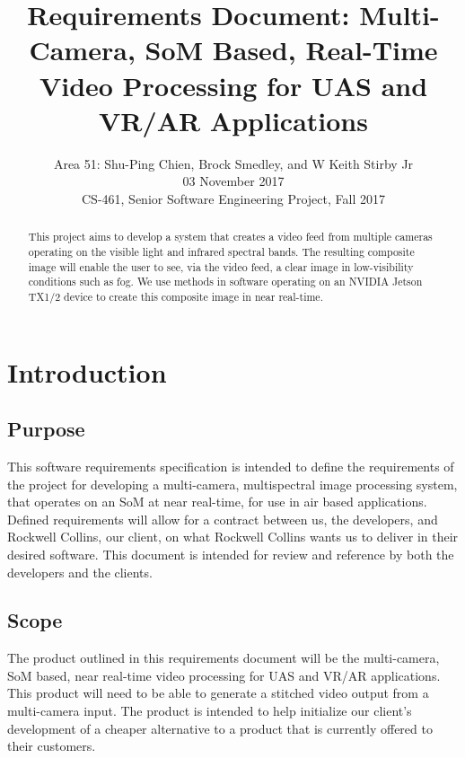 \documentclass[letterpaper,10pt,serif,draftclsnofoot,onecolumn,compsoc,titlepage]{IEEEtran}
\title{Requirements Document: Multi-Camera, SoM Based, Real-Time Video Processing for UAS and VR/AR Applications}
\author{Area 51: Shu-Ping Chien, Brock Smedley, and W Keith Stirby Jr \\ 03 November 2017 \\ CS-461, Senior Software Engineering Project, Fall 2017}
\begin{document}
\begin{titlepage}
\maketitle
\begin{abstract}

This project aims to develop a system that creates a video feed from multiple cameras 
operating on the visible light and infrared spectral bands. The resulting composite 
image will enable the user to see, via the video feed, a clear image in low-visibility 
conditions such as fog. We use methods in software operating on an NVIDIA Jetson 
TX1/2 device to create this composite image in near real-time.\\

\thispagestyle{empty}
\end{abstract}
\end{titlepage}
\newpage

\tableofcontents
\newpage

\section{Introduction}

\subsection{Purpose}

This software requirements specification is intended to define the requirements of the 
project for developing a multi-camera, multispectral image processing system, that 
operates on an SoM at near real-time, for use in air based 
applications. Defined requirements will allow for a contract between us, the 
developers, and Rockwell Collins, our client, on what Rockwell Collins wants us to 
deliver in their desired software. This document is intended for review and reference 
by both the developers and the clients.\\

\subsection{Scope}

The product outlined in this requirements document will be the multi-camera, SoM based,
 near real-time video processing for UAS and VR/AR applications. This product will need to 
 be able to generate a stitched video output from a multi-camera input. The product is 
 intended to help initialize our client's development of a cheaper alternative to a 
 product that is currently offered to their customers.\\
\end{document}

